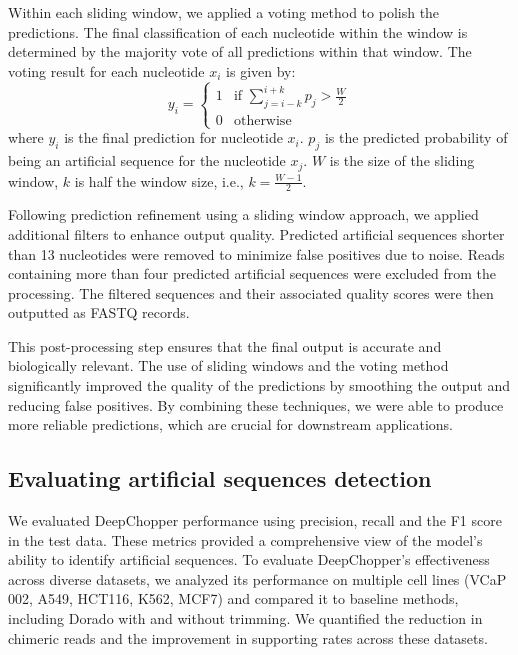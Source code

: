 \documentclass[pdflatex,sn-nature, lineno]{sn-jnl}%
\theoremstyle{thmstyleone}%
\theoremstyle{thmstyletwo}%
\theoremstyle{thmstylethree}%
\begin{document}
Within each sliding window, we applied a voting method to polish the predictions.
The final classification of each nucleotide within the window is determined by the majority vote of all predictions within that window.
The voting result for each nucleotide \( x_i \) is given by:
\[
	y_i = \begin{cases}
		1 & \text{if } \sum_{j=i-k}^{i+k} p_j > \frac{W}{2} \\
		0 & \text{otherwise}
	\end{cases}
\]
where \( y_i \) is the final prediction for nucleotide \( x_i \). \( p_j \) is the predicted probability of being an artificial sequence for the nucleotide \( x_j \). \( W \) is the size of the sliding window, \( k \) is half the window size, i.e., \( k = \frac{W-1}{2} \).

Following prediction refinement using a sliding window approach, we applied additional filters to enhance output quality.
Predicted artificial sequences shorter than 13 nucleotides were removed to minimize false positives due to noise.
Reads containing more than four predicted artificial sequences were excluded from the processing.
The filtered sequences and their associated quality scores were then outputted as FASTQ records.

This post-processing step ensures that the final output is accurate and biologically relevant.
The use of sliding windows and the voting method significantly improved the quality of the predictions by smoothing the output and reducing false positives.
By combining these techniques, we were able to produce more reliable predictions, which are crucial for downstream applications.


\subsection{Evaluating artificial sequences detection}

We evaluated DeepChopper performance using precision, recall and the F1 score in the test data.
These metrics provided a comprehensive view of the model's ability to identify artificial sequences.
To evaluate DeepChopper's effectiveness across diverse datasets, we analyzed its performance on multiple cell lines (VCaP 002, A549, HCT116, K562, MCF7) and compared it to baseline methods, including Dorado with and without trimming.
We quantified the reduction in chimeric reads and the improvement in supporting rates across these datasets.
\end{document}
